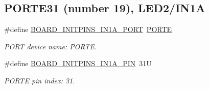 \subsection*{P\+O\+R\+T\+E31 (number 19), L\+E\+D2/\+I\+N1A}
\begin{DoxyCompactItemize}
\item 
\mbox{\label{group__pin__mux_ga6f39efd4950221751f1143d85a5f1af3}} 
\#define \mbox{\hyperlink{group__pin__mux_ga6f39efd4950221751f1143d85a5f1af3}{B\+O\+A\+R\+D\+\_\+\+I\+N\+I\+T\+P\+I\+N\+S\+\_\+\+I\+N1\+A\+\_\+\+P\+O\+RT}}~\mbox{\hyperlink{group___p_o_r_t___peripheral___access___layer_ga7e2386d3b1084b5b875ae3696f550ba9}{P\+O\+R\+TE}}
\begin{DoxyCompactList}\small\item\em P\+O\+RT device name\+: P\+O\+R\+TE. \end{DoxyCompactList}\item 
\mbox{\label{group__pin__mux_gaf4eb0408529a1675aeaa4148cd89461e}} 
\#define \mbox{\hyperlink{group__pin__mux_gaf4eb0408529a1675aeaa4148cd89461e}{B\+O\+A\+R\+D\+\_\+\+I\+N\+I\+T\+P\+I\+N\+S\+\_\+\+I\+N1\+A\+\_\+\+P\+IN}}~31U
\begin{DoxyCompactList}\small\item\em P\+O\+R\+TE pin index\+: 31. \end{DoxyCompactList}\end{DoxyCompactItemize}
